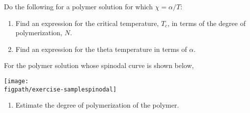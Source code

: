 \begin{activity}
\begin{exercises}
\begin{enumerate}
				
		\end{enumerate}
		
	\exercise Do the following for a polymer solution for which $\chi = \alpha/T$:
		
		\begin{enumerate}
			\item Find an expression for the critical temperature, $T_c$, in terms of the degree of polymerization, $N$.
			
				\begin{solution}\end{solution}
				
			\item Find an expression for the theta temperature  in terms of $\alpha$.
			
				\begin{solution}\end{solution}
				
		\end{enumerate}
		
	\exercise For the polymer solution whose spinodal curve is shown below,
	
		\centerline{\texttt{[image: \\figpath/exercise-samplespinodal]}}
	
		\begin{enumerate}
			\item Estimate the degree of polymerization of the polymer.
				

\end{enumerate}
\end{exercises}
\end{activity}
